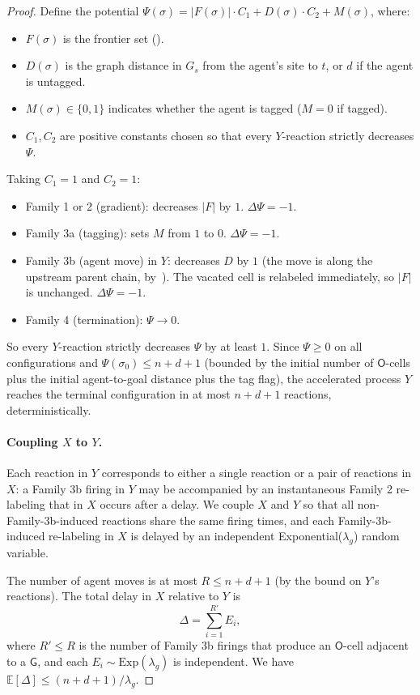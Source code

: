 \documentclass[11pt]{article}
\theoremstyle{plain}
\theoremstyle{definition}
\theoremstyle{remark}
\begin{document}
\begin{proof}
Define the potential $\Psi(\sigma) = |F(\sigma)| \cdot C_1 + D(\sigma) \cdot C_2 + M(\sigma)$, where:
\begin{itemize}
    \item $F(\sigma)$ is the frontier set ().
    \item $D(\sigma)$ is the graph distance in $G_s$ from the agent's site to $t$, or $d$ if the agent is untagged.
    \item $M(\sigma) \in \{0, 1\}$ indicates whether the agent is tagged ($M=0$ if tagged).
    \item $C_1, C_2$ are positive constants chosen so that every $Y$-reaction strictly decreases $\Psi$.
\end{itemize}
Taking $C_1 = 1$ and $C_2 = 1$:
\begin{itemize}
    \item Family 1 or 2 (gradient): decreases $|F|$ by $1$. $\Delta \Psi = -1$.
    \item Family 3a (tagging): sets $M$ from $1$ to $0$. $\Delta \Psi = -1$.
    \item Family 3b (agent move) in $Y$: decreases $D$ by $1$ (the move is along the upstream parent chain, by~). The vacated cell is relabeled immediately, so $|F|$ is unchanged. $\Delta \Psi = -1$.
    \item Family 4 (termination): $\Psi \to 0$.
\end{itemize}

So every $Y$-reaction strictly decreases $\Psi$ by at least $1$. Since $\Psi \geq 0$ on all configurations and $\Psi(\sigma_0) \leq n + d + 1$ (bounded by the initial number of $\mathsf{O}$-cells plus the initial agent-to-goal distance plus the tag flag), the accelerated process $Y$ reaches the terminal configuration in at most $n + d + 1$ reactions, deterministically.

\paragraph{Coupling $X$ to $Y$.} Each reaction in $Y$ corresponds to either a single reaction or a pair of reactions in $X$: a Family 3b firing in $Y$ may be accompanied by an instantaneous Family 2 re-labeling that in $X$ occurs after a delay. We couple $X$ and $Y$ so that all non-Family-3b-induced reactions share the same firing times, and each Family-3b-induced re-labeling in $X$ is delayed by an independent Exponential($\lambda_g$) random variable.

The number of agent moves is at most $R \leq n + d + 1$ (by the bound on $Y$'s reactions). The total delay in $X$ relative to $Y$ is
\[
\Delta = \sum_{i=1}^{R'} E_i,
\]
where $R' \leq R$ is the number of Family 3b firings that produce an $\mathsf{O}$-cell adjacent to a $\mathsf{G}$, and each $E_i \sim \mathrm{Exp}(\lambda_g)$ is independent. We have $\mathbb{E}[\Delta] \leq (n + d + 1)/\lambda_g$.


\end{proof}
\end{document}

